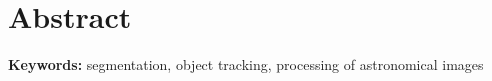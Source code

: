 \chapter*{Abstract}\label{chap:abstract_en}


\bigskip






\bigskip

\noindent \textbf{Keywords:} segmentation, object tracking, processing of astronomical images 
\vfill\eject 